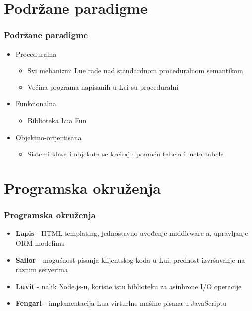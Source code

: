 \documentclass{beamer}
\begin{document}
\section{Podržane paradigme}
\begin{frame}
\frametitle{Podržane paradigme}

\begin{itemize}

\item Proceduralna
\begin{itemize}
\item Svi mehanizmi Lue rade nad standardnom proceduralnom semantikom
\item Većina programa napisanih u Lui su proceduralni
\end{itemize}

\item Funkcionalna
\begin{itemize}
\item Biblioteka Lua Fun
\end{itemize}

\item Objektno-orijentisana
\begin{itemize}
\item Sistemi klasa i objekata se kreiraju pomoću tabela i meta-tabela
\end{itemize}


\end{itemize}

\end{frame}



\section{Programska okruženja}
\begin{frame} 
\frametitle{Programska okruženja}

\begin{itemize}
\item \textbf{Lapis} - HTML templating, jednostavno uvođenje middleware-a, upravljanje ORM modelima 

\item \textbf{Sailor} - mogućnost pisanja klijentskog koda u Lui, prednost izvršavanje na raznim serverima

\item \textbf{Luvit} - nalik Node.js-u, koriste istu biblioteku za asinhrone I/O operacije

\item \textbf{Fengari} - implementacija Lua virtuelne mašine pisana u JavaScriptu

\end{itemize}

\end{frame}
\end{document}
